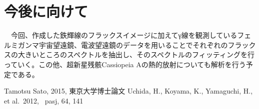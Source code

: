 \documentclass[10pt]{article}
\begin{document}
\section{{\normalsize 今後に向けて}}
~~今回、作成した鉄輝線のフラックスイメージに加えてγ線を観測しているフェルミガンマ宇宙望遠鏡、電波望遠鏡のデータを用いることでそれぞれのフラックスの大きいところのスペクトルを抽出し、そのスペクトルのフィッティングを行っていく。この他、超新星残骸Cassiopeia Aの熱的放射についても解析を行う予定である。

\begin{thebibliography}{2}
  Tamotsu Sato,  2015, 東京大学博士論文
 Uchida, H., Koyama, K., Yamaguchi, H., et al.\  2012, \ pasj, 64, 141
\end{thebibliography}
\end{document}
